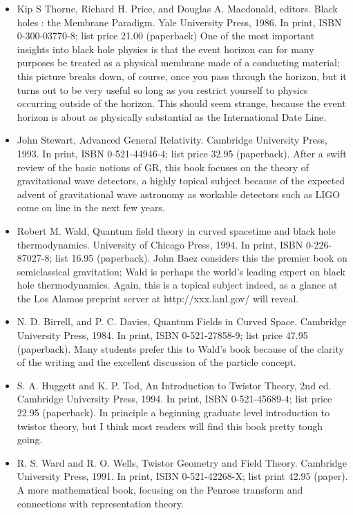 \documentclass[10pt,a4paper]{book}
\theoremstyle{definition}
\begin{document}
\begin{itemize}
\item Kip S Thorne, Richard H. Price, and Douglas A. Macdonald, editors. Black holes : the Membrane Paradigm.
Yale University Press, 1986.
In print, ISBN 0-300-03770-8; list price 21.00 (paperback)
One of the most important insights into black hole physics is that the event horizon can for many purposes be treated as a physical membrane made of a conducting material; this picture breaks down, of course, once you pass through the horizon, but it turns out to be very useful so long as you restrict yourself to physics occurring outside of the horizon.  This should seem strange, because the event horizon is about as physically substantial as the International Date Line.

\item John Stewart,
Advanced General Relativity.
Cambridge University Press, 1993.
In print, ISBN 0-521-44946-4; list price 32.95 (paperback).
After a swift review of the basic notions of GR, this book focuses on the theory of gravitational wave detectors, a highly topical subject because of the expected advent of gravitational wave astronomy as workable detectors such as LIGO come on line in the next few years.

\item Robert M. Wald,
Quantum field theory in curved spacetime and black hole thermodynamics.
University of Chicago Press, 1994.
In print, ISBN 0-226-87027-8; list 16.95 (paperback).
John Baez considers this the premier book on semiclassical gravitation; Wald is perhaps the world's leading expert on black hole thermodynamics.  Again, this is a topical subject indeed, as a glance at the Los Alamos preprint server at http://xxx.lanl.gov/ will reveal.

\item N. D. Birrell, and P. C. Davies,
Quantum Fields in Curved Space.
Cambridge University Press, 1984.
In print, ISBN 0-521-27858-9; list price 47.95 (paperback).
Many students prefer this to Wald's book because of the clarity of the writing and the excellent discussion of the particle concept.

\item S. A. Huggett and K. P. Tod,
An Introduction to Twistor Theory, 2nd ed.
Cambridge University Press, 1994.
In print, ISBN 0-521-45689-4; list price 22.95 (paperback).
In principle a beginning graduate level introduction to twistor theory, but I think most readers will find this book pretty tough going.

\item R. S. Ward and R. O. Wells,
Twistor Geometry and Field Theory.
Cambridge University Press, 1991.
In print, ISBN 0-521-42268-X; list print 42.95 (paper).
A more mathematical book, focusing on the Penrose transform and connections with representation theory.


\end{itemize}
\end{document}
